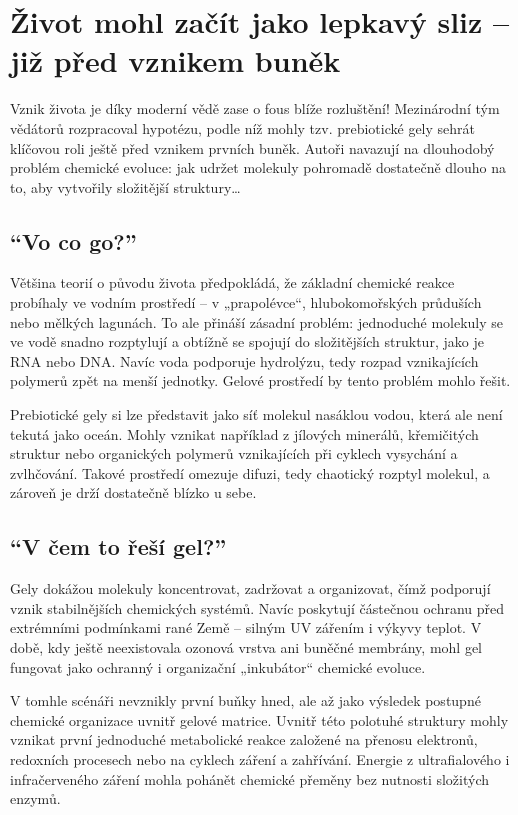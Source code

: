 \documentclass[main.tex]{subfiles}
\begin{document}
\section{Život mohl začít jako lepkavý sliz – již před vznikem buněk}
Vznik života je díky moderní vědě zase o fous blíže rozluštění! Mezinárodní tým vědátorů rozpracoval hypotézu, podle níž mohly tzv. prebiotické gely sehrát klíčovou roli ještě před vznikem prvních buněk. Autoři navazují na dlouhodobý problém chemické evoluce: jak udržet molekuly pohromadě dostatečně dlouho na to, aby vytvořily složitější struktury…
\subsection*{\enquote{Vo co go?}}
Většina teorií o původu života předpokládá, že základní chemické reakce probíhaly ve vodním prostředí – v „prapolévce“, hlubokomořských průduších nebo mělkých lagunách. To ale přináší zásadní problém: jednoduché molekuly se ve vodě snadno rozptylují a obtížně se spojují do složitějších struktur, jako je RNA nebo DNA. Navíc voda podporuje hydrolýzu, tedy rozpad vznikajících polymerů zpět na menší jednotky. Gelové prostředí by tento problém mohlo řešit.\par
Prebiotické gely si lze představit jako síť molekul nasáklou vodou, která ale není tekutá jako oceán. Mohly vznikat například z jílových minerálů, křemičitých struktur nebo organických polymerů vznikajících při cyklech vysychání a zvlhčování. Takové prostředí omezuje difuzi, tedy chaotický rozptyl molekul, a zároveň je drží dostatečně blízko u sebe.
\subsection*{\enquote{V čem to řeší gel?}}
Gely dokážou molekuly koncentrovat, zadržovat a organizovat, čímž podporují vznik stabilnějších chemických systémů. Navíc poskytují částečnou ochranu před extrémními podmínkami rané Země – silným UV zářením i výkyvy teplot. V době, kdy ještě neexistovala ozonová vrstva ani buněčné membrány, mohl gel fungovat jako ochranný i organizační „inkubátor“ chemické evoluce.\par
V tomhle scénáři nevznikly první buňky hned, ale až jako výsledek postupné chemické organizace uvnitř gelové matrice. Uvnitř této polotuhé struktury mohly vznikat první jednoduché metabolické reakce založené na přenosu elektronů, redoxních procesech nebo na cyklech záření a zahřívání. Energie z ultrafialového i infračerveného záření mohla pohánět chemické přeměny bez nutnosti složitých enzymů.
\end{document}

